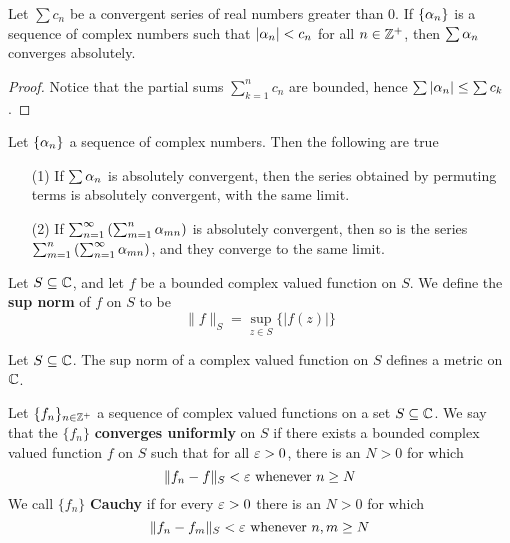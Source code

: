 \begin{lemma}\label{2.2.3}
    Let $\sum{c_n}$ be a convergent series of real numbers greater than $0$. If
    $\{\alpha_n\}$ is a sequence of complex numbers such that $|\alpha_n|<c_n$ for all
    $n \in \mathbb{Z}^+$, then  $\sum{\alpha_n}$ converges absolutely.
\end{lemma}
\begin{proof}
    Notice that the partial sums $\sum_{k=1}^n{c_n}$ are bounded, hence
    $\sum{|\alpha_n|} \leq \sum{c_k}$.
\end{proof}

\begin{lemma}\label{2.2.4}
    Let $\{\alpha_n\}$ a sequence of complex numbers. Then the following are true
    \begin{enumerate}
        \item[(1)] If $\sum{\alpha_n}$ is absolutely convergent, then the series
            obtained by permuting terms is absolutely convergent, with the same
            limit.

        \item[(2)] If $\sum_{n=1}^\infty{(\sum_{m=1}^n{\alpha_{mn}})}$ is absolutely
            convergent, then so is the series
            $\sum_{m=1}^n{(\sum_{n=1}^\infty{\alpha_{mn}})}$, and they converge to
            the same limit.
    \end{enumerate}
\end{lemma}

\begin{definition}
    Let $S \subseteq \mathbb{C}$, and let $f$ be a bounded complex valued function on
    $S$. We define the \textbf{sup norm} of $f$ on  $S$ to be
    \begin{equation*}
        \|f\|_S=\sup_{z \in S}{\{|f(z)|\}}
    \end{equation*}
\end{definition}

\begin{lemma}\label{2.2.5}
    Let $S \subseteq \mathbb{C}$. The sup norm of a complex valued function on $S$
    defines a metric on $\mathbb{C}$.
\end{lemma}

\begin{definition}
    Let $\{f_n\}_{n \in \mathbb{Z}^+}$ a sequence of complex valued functions on a set
    $S \subseteq \mathbb{C}$. We say that the  $\{f_n\}$ \textbf{converges uniformly} on
    $S$ if there exists a bounded complex valued function $f$ on $S$ such that
    for all $\varepsilon>0$, there is an $N>0$ for which
    \begin{equation*}
        \|f_n-f\|_S<\varepsilon \text{ whenever } n \geq N
    \end{equation*}
    We call $\{f_n\}$ \textbf{Cauchy} if for every $\varepsilon>0$ there is an  $N>0$ for
    which
    \begin{equation*}
        \|f_n-f_m\|_S<\varepsilon \text{ whenever } n,m \geq N
    \end{equation*}
\end{definition}

